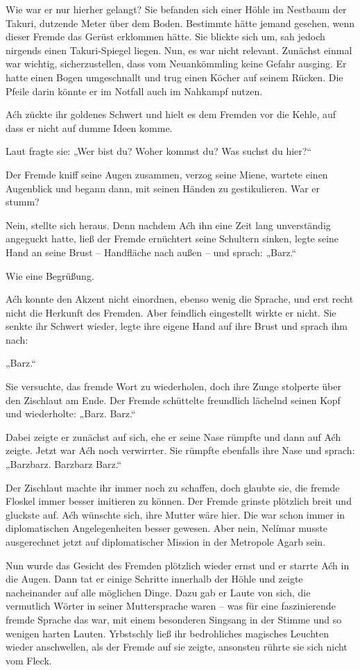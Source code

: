 Wie war er nur hierher gelangt? Sie befanden sich einer Höhle im Nestbaum der Takuri, dutzende Meter über dem Boden. Bestimmte hätte jemand gesehen, wenn dieser Fremde das Gerüst erklommen hätte. Sie blickte sich um, sah jedoch nirgends einen Takuri-Spiegel liegen. Nun, es war nicht relevant. Zunächst einmal war wichtig, sicherzustellen, dass vom Neuankömmling keine Gefahr ausging. Er hatte einen Bogen umgeschnallt und trug einen Köcher auf seinem Rücken. Die Pfeile darin könnte er im Notfall auch im Nahkampf nutzen.

Aćh zückte ihr goldenes Schwert und hielt es dem Fremden vor die Kehle, auf dass er nicht auf dumme Ideen komme.

Laut fragte sie: „Wer bist du? Woher kommst du? Was suchst du hier?“

Der Fremde kniff seine Augen zusammen, verzog seine Miene, wartete einen Augenblick und begann dann, mit seinen Händen zu gestikulieren. War er stumm?

Nein, stellte sich heraus. Denn nachdem Aćh ihn eine Zeit lang unverständig angeguckt hatte, ließ der Fremde ernüchtert seine Schultern sinken, legte seine Hand an seine Brust – Handfläche nach außen – und sprach: „Barz.“

Wie eine Begrüßung.

Aćh konnte den Akzent nicht einordnen, ebenso wenig die Sprache, und erst recht nicht die Herkunft des Fremden. Aber feindlich eingestellt wirkte er nicht. Sie senkte ihr Schwert wieder, legte ihre eigene Hand auf ihre Brust und sprach ihm nach:

„Barz.“

Sie versuchte, das fremde Wort zu wiederholen, doch ihre Zunge stolperte über den Zischlaut am Ende. Der Fremde schüttelte freundlich lächelnd seinen Kopf und wiederholte: „Barz. Barz.“

Dabei zeigte er zunächst auf sich, ehe er seine Nase rümpfte und dann auf Aćh zeigte. Jetzt war Aćh noch verwirrter. Sie rümpfte ebenfalls ihre Nase und sprach: „Barzbarz. Barzbarz Barz.“

Der Zischlaut machte ihr immer noch zu schaffen, doch glaubte sie, die fremde Floskel immer besser imitieren zu können. Der Fremde grinste plötzlich breit und gluckste auf. Aćh wünschte sich, ihre Mutter wäre hier. Die war schon immer in diplomatischen Angelegenheiten besser gewesen. Aber nein, Nelímar musste ausgerechnet jetzt auf diplomatischer Mission in der Metropole Agarb sein.

Nun wurde das Gesicht des Fremden plötzlich wieder ernst und er starrte Aćh in die Augen. Dann tat er einige Schritte innerhalb der Höhle und zeigte nacheinander auf alle möglichen Dinge. Dazu gab er Laute von sich, die vermutlich Wörter in seiner Muttersprache waren – was für eine faszinierende fremde Sprache das war, mit einem besonderen Singsang in der Stimme und so wenigen harten Lauten. Yrbstschly ließ ihr bedrohliches magisches Leuchten wieder anschwellen, als der Fremde auf sie zeigte, ansonsten rührte sie sich nicht vom Fleck.


